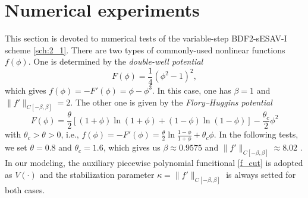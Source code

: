 \documentclass{m2an}
\begin{document}
\section{Numerical experiments}\label{sec:NumTest}
This section is devoted to numerical tests of the variable-step BDF2-sESAV-I scheme \eqref{sch:2_1}. There are two types of commonly-used nonlinear functions $ f(\phi) $. One is determined by the \emph{double-well potential} \cite{SISC_2019_Akrivis}
\begin{equation}\label{poten:dw}
	F( \phi ) = \frac{1}{4} ( \phi^2 - 1 )^2,
\end{equation}
which gives $
f(\phi) = -F'( \phi ) = \phi - \phi^3 $. In this case, one has $ \beta = 1 $ and $ \| f' \|_{ C[-\beta,\beta] } = 2 $. The other one is given by the \emph{Flory--Huggins potential} \cite{NM_1992_Elliott}
\begin{equation}\label{poten:fh}
	F( \phi ) = \frac{\theta}{2} [ ( 1 + \phi ) \ln ( 1 + \phi ) + ( 1 - \phi ) \ln ( 1 - \phi ) ] - \frac{ \theta_{c} }{2} \phi^2
\end{equation}
with $ \theta_{c} > \theta > 0 $, i.e., $ f(\phi) = - F'( \phi ) = \frac{\theta}{2} \ln \frac{ 1 - \phi }{ 1 + \phi } + \theta_{c} \phi $. In the following tests, we set $ \theta = 0.8 $ and $ \theta_{c} = 1.6 $, which gives us $ \beta \approx 0.9575 $ and $ \| f' \|_{ C[-\beta,\beta] } \approx 8.02 $ \cite{SINUM_Ju_2022,JSC_Ju_2022}. In our modeling, the auxiliary piecewise polynomial funcitional \eqref{f_cut} is adopted as $V(\cdot)$ and the stabilization parameter $ \kappa = \| f' \|_{ C[-\beta,\beta] } $ is always setted for both cases.

\end{document}
